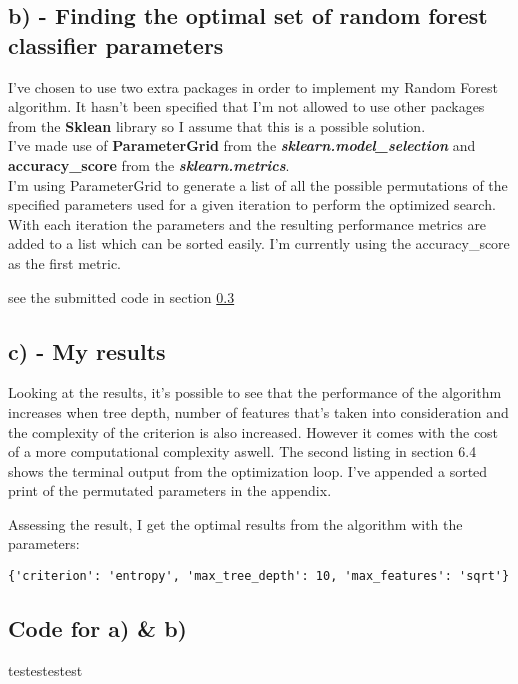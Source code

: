\subsection{b) - Finding the optimal set of random forest classifier parameters}
I've chosen to use two extra packages in order to implement my Random Forest algorithm.
It hasn't been specified that I'm not allowed to use other packages from the \textbf{Sklean} library
so I assume that this is a possible solution.
\\
I've made use of \textbf{ParameterGrid} from the \textbf{\textit{sklearn.model\_selection}}
and \textbf{accuracy\_score} from the \textbf{\textit{sklearn.metrics}}.
\\
I'm using ParameterGrid to generate a list of all the possible permutations of the specified parameters used
for a given iteration to perform the optimized search.
With each iteration the parameters and the resulting performance metrics are added to a list which can be
sorted easily. I'm currently using the accuracy\_score as the first metric.

see the submitted code in section \ref{Code_setup}






\subsection{c) - My results}
Looking at the results, it's possible to see that the performance of the algorithm increases
when tree depth, number of features that's taken into consideration and the complexity of the criterion
is also increased.
However it comes with the cost of a more computational complexity aswell. The second listing in section 6.4 
shows the terminal output from the optimization loop.
I've appended a sorted print of the permutated parameters in the appendix. 

Assessing the result, I get the optimal results from the algorithm with the parameters:
\begin{verbatim}
{'criterion': 'entropy', 'max_tree_depth': 10, 'max_features': 'sqrt'}
\end{verbatim}





\subsection{Code for a) \& b)}
\label{Code_setup}
testestestest

